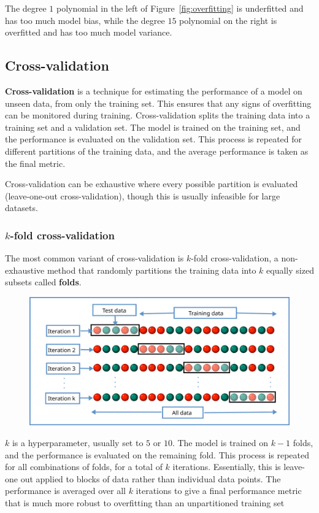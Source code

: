 \documentclass[12pt]{report}
\theoremstyle{definition}
\theoremstyle{remark}
\begin{document}
The degree $1$ polynomial in the left of Figure~\ref{fig:overfitting} is underfitted and has too much model bias, while the degree $15$ polynomial on the right is overfitted and has too much model variance.

\subsection{Cross-validation}
\textbf{Cross-validation} is a technique for estimating the performance of a model on unseen data, from only the training set. This ensures that any signs of overfitting can be monitored during training. Cross-validation splits the training data into a training set and a validation set. The model is trained on the training set, and the performance is evaluated on the validation set. This process is repeated for different partitions of the training data, and the average performance is taken as the final metric.

Cross-validation can be exhaustive where every possible partition is evaluated (leave-one-out cross-validation), though this is usually infeasible for large datasets.

\subsubsection{$k$-fold cross-validation}
The most common variant of cross-validation is $k$-fold cross-validation, a non-exhaustive method that randomly partitions the training data into $k$ equally sized subsets called \textbf{folds}.

\begin{figure}[h]
    \centering
    \includegraphics[width=\linewidth]{figs/kfold_cross_validation.png}
    \caption{\cite{commons_filek-fold_2024}}
    \label{fig:enter-label}
\end{figure}

$k$ is a hyperparameter, usually set to $5$ or $10$. The model is trained on $k-1$ folds, and the performance is evaluated on the remaining fold. This process is repeated for all combinations of folds, for a total of $k$ iterations. Essentially, this is leave-one out applied to blocks of data rather than individual data points. The performance is averaged over all $k$ iterations to give a final performance metric that is much more robust to overfitting than an unpartitioned training set
\end{document}
